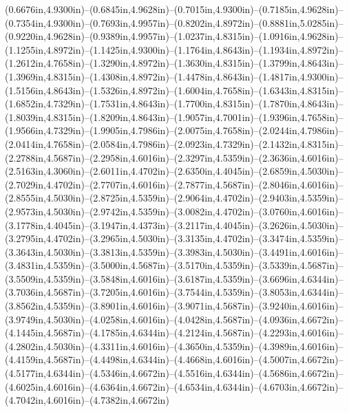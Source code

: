 (0.6676in,4.9300in)--(0.6845in,4.9628in)--(0.7015in,4.9300in)--(0.7185in,4.9628in)--(0.7354in,4.9300in)--(0.7693in,4.9957in)--(0.8202in,4.8972in)--(0.8881in,5.0285in)--(0.9220in,4.9628in)--(0.9389in,4.9957in)--(1.0237in,4.8315in)--(1.0916in,4.9628in)--(1.1255in,4.8972in)--(1.1425in,4.9300in)--(1.1764in,4.8643in)--(1.1934in,4.8972in)--(1.2612in,4.7658in)--(1.3290in,4.8972in)--(1.3630in,4.8315in)--(1.3799in,4.8643in)--(1.3969in,4.8315in)--(1.4308in,4.8972in)--(1.4478in,4.8643in)--(1.4817in,4.9300in)--(1.5156in,4.8643in)--(1.5326in,4.8972in)--(1.6004in,4.7658in)--(1.6343in,4.8315in)--(1.6852in,4.7329in)--(1.7531in,4.8643in)--(1.7700in,4.8315in)--(1.7870in,4.8643in)--(1.8039in,4.8315in)--(1.8209in,4.8643in)--(1.9057in,4.7001in)--(1.9396in,4.7658in)--(1.9566in,4.7329in)--(1.9905in,4.7986in)--(2.0075in,4.7658in)--(2.0244in,4.7986in)--(2.0414in,4.7658in)--(2.0584in,4.7986in)--(2.0923in,4.7329in)--(2.1432in,4.8315in)--(2.2788in,4.5687in)--(2.2958in,4.6016in)--(2.3297in,4.5359in)--(2.3636in,4.6016in)--(2.5163in,4.3060in)--(2.6011in,4.4702in)--(2.6350in,4.4045in)--(2.6859in,4.5030in)--(2.7029in,4.4702in)--(2.7707in,4.6016in)--(2.7877in,4.5687in)--(2.8046in,4.6016in)--(2.8555in,4.5030in)--(2.8725in,4.5359in)--(2.9064in,4.4702in)--(2.9403in,4.5359in)--(2.9573in,4.5030in)--(2.9742in,4.5359in)--(3.0082in,4.4702in)--(3.0760in,4.6016in)--(3.1778in,4.4045in)--(3.1947in,4.4373in)--(3.2117in,4.4045in)--(3.2626in,4.5030in)--(3.2795in,4.4702in)--(3.2965in,4.5030in)--(3.3135in,4.4702in)--(3.3474in,4.5359in)--(3.3643in,4.5030in)--(3.3813in,4.5359in)--(3.3983in,4.5030in)--(3.4491in,4.6016in)--(3.4831in,4.5359in)--(3.5000in,4.5687in)--(3.5170in,4.5359in)--(3.5339in,4.5687in)--(3.5509in,4.5359in)--(3.5848in,4.6016in)--(3.6187in,4.5359in)--(3.6696in,4.6344in)--(3.7036in,4.5687in)--(3.7205in,4.6016in)--(3.7544in,4.5359in)--(3.8053in,4.6344in)--(3.8562in,4.5359in)--(3.8901in,4.6016in)--(3.9071in,4.5687in)--(3.9240in,4.6016in)--(3.9749in,4.5030in)--(4.0258in,4.6016in)--(4.0428in,4.5687in)--(4.0936in,4.6672in)--(4.1445in,4.5687in)--(4.1785in,4.6344in)--(4.2124in,4.5687in)--(4.2293in,4.6016in)--(4.2802in,4.5030in)--(4.3311in,4.6016in)--(4.3650in,4.5359in)--(4.3989in,4.6016in)--(4.4159in,4.5687in)--(4.4498in,4.6344in)--(4.4668in,4.6016in)--(4.5007in,4.6672in)--(4.5177in,4.6344in)--(4.5346in,4.6672in)--(4.5516in,4.6344in)--(4.5686in,4.6672in)--(4.6025in,4.6016in)--(4.6364in,4.6672in)--(4.6534in,4.6344in)--(4.6703in,4.6672in)--(4.7042in,4.6016in)--(4.7382in,4.6672in) 